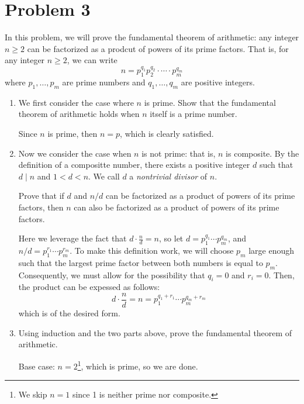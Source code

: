 \documentclass[10pt]{article}
\begin{document}
	\section*{Problem 3}
	In this problem, we will prove the fundamental theorem of arithmetic: any 
	integer \( n \ge 2 \) can be factorized as a prodcut of powers of its 
	prime factors. That is, for any integer \( n \ge 2 \), we can write
	\[
	 n = p_1^{q_1} p_2^{q_2} \cdot \cdots \cdot p_m^{q_m}
	\] 
	where \( p_1, \dots, p_m \) are prime numbers and \( q_1, \dots, q_m  \) are 
	positive integers. 
	\begin{enumerate}[label=\alph*)]
		\item We first consider the case where \( n \) is prime. Show that the 
			fundamental theorem of arithmetic holds when \( n \) itself is a prime 
			number. 

			\begin{solution}
				Since \( n \) is prime, then \( n = p \), which is clearly 
				satisfied. 
			\end{solution}
		\item Now we consider the case when \( n \) is not prime: that is, 
			\( n \) is composite. By the definition of a compositte number, there 
			exists a positive integer \( d \) such that \( d \mid n \) and
			\( 1 < d < n \). We call \( d \) a \textit{nontrivial divisor} of \( n \). 

			Prove that if \( d \) and  \( n / d \) can be factorized as a product 
			of powers of its prime factors, then \( n \) can also be factorized 
			as a product of powers of its prime factors. 

			\begin{solution}
				Here we leverage the fact that \( d \cdot \frac{n}{d} = n \), 
				so let \( d = p_1^{q_1} \cdots p_m^{q_m} \), and 
				\( n / d = p_1^{r_1} \cdots p_m^{r_m} \). To make this 
				definition work, we will choose 
				\( p_m \) large enough such that the largest prime factor between 
				both numbers is equal to \( p_m \). Consequently, we must 
				allow for the possibility that \( q_i = 0 \) and \( r_i = 0 \). 
				Then, the product can be expessed as follows:
				\[
				d \cdot \frac{n}{d} = n = p_1^{q_1 + r_1} \cdots p_m^{q_m + r_m}
				\] 
				which is of the desired form. 
			\end{solution}
		\item Using induction and the two parts above, prove the fundamental 
			theorem of arithmetic. 

			\begin{solution}
				Base case: \( n = 2 \)\footnote{We skip \( n = 1 \) since 
				1 is neither prime nor composite.}, which is prime, so we are done. 


\end{solution}
\end{enumerate}
\end{document}

